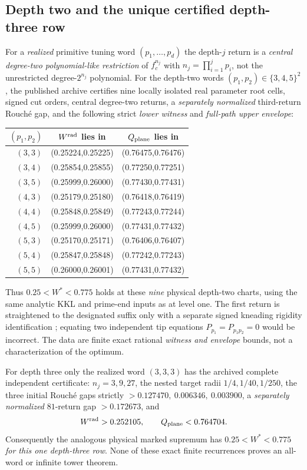 \subsection{Depth two and the unique certified depth-three row}
For a \emph{realized} primitive
tuning word
$(p_1,\ldots,p_d)$
the depth-$j$ return is a
\emph{central degree-two
polynomial-like restriction}
of $f_c^{n_j}$ with
$n_j=\prod_{i=1}^j p_i$,
not the unrestricted
degree-$2^{n_j}$ polynomial.
For the depth-two words
$(p_1,p_2)\in\{3,4,5\}^2$,
the published archive
certifies nine locally
isolated real parameter
root cells, signed cut
orders, central degree-two
returns, a \emph{separately
normalized} third-return
Rouch\'e gap, and the
following strict \emph{lower
witness} and \emph{full-path
upper envelope}:
\begin{center}
\begin{tabular}{rcc}
\toprule
$(p_1,p_2)$ & $W^{\rm rad}$ lies in&
$Q_{\rm plane}$ lies in\\\midrule
$(3,3)$&(0.25224,0.25225)&(0.76475,0.76476)\\
$(3,4)$&(0.25854,0.25855)&(0.77250,0.77251)\\
$(3,5)$&(0.25999,0.26000)&(0.77430,0.77431)\\
$(4,3)$&(0.25179,0.25180)&(0.76418,0.76419)\\
$(4,4)$&(0.25848,0.25849)&(0.77243,0.77244)\\
$(4,5)$&(0.25999,0.26000)&(0.77431,0.77432)\\
$(5,3)$&(0.25170,0.25171)&(0.76406,0.76407)\\
$(5,4)$&(0.25847,0.25848)&(0.77242,0.77243)\\
$(5,5)$&(0.26000,0.26001)&(0.77431,0.77432)\\
\bottomrule
\end{tabular}
\end{center}
Thus $0.25<W^*<0.775$
holds at these \emph{nine}
physical depth-two charts,
using the same analytic
KKL and prime-end inputs
as at level one.  The first
return is straightened
to the designated suffix
only with a separate
signed kneading rigidity
identification
\cite[Theorem II.10.1]{deMeloVanStrien1993};
equating two independent
tip equations
$P_{p_1}=P_{p_1p_2}=0$
would be incorrect.
The data are finite exact
rational \emph{witness and
envelope} bounds, not
a characterization of
the optimum.

For depth three only the
realized word $(3,3,3)$
has the archived
complete independent
certificate:
$n_j=3,9,27$,
the nested target radii
$1/4,1/40,1/250$,
the three initial
Rouch\'e gaps strictly
$>0.127470,\ 0.006346,\
0.003900$, a \emph{separately
normalized} $81$-return
gap $>0.172673$,
and
\[
 W^{\rm rad}>0.252105,\qquad
 Q_{\rm plane}<0.764704.
\]
Consequently the analogous
physical marked supremum
has $0.25<W^*<0.775$
\emph{for this one
depth-three row}.
None of these exact
finite recurrences proves
an all-word or infinite
tower theorem.

